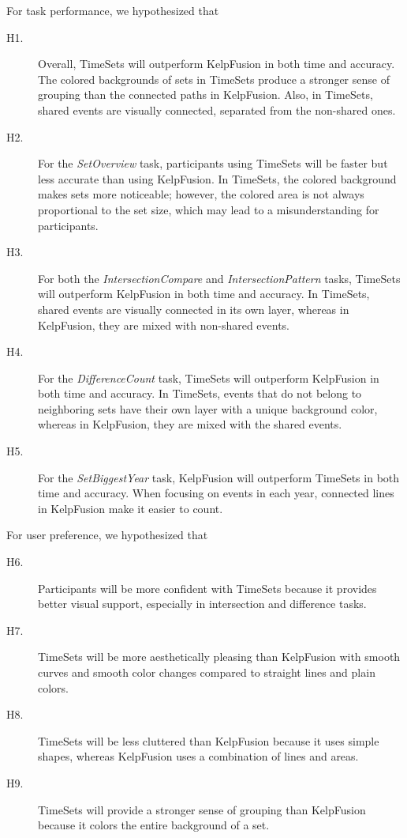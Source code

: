 For task performance, we hypothesized that
\begin{description}
	\item [H1.] Overall, TimeSets will outperform KelpFusion in both time and accuracy. The colored backgrounds of sets in TimeSets produce a stronger sense of grouping than the connected paths in KelpFusion. Also, in TimeSets, shared events are visually connected, separated from the non-shared ones.
	
	\item [H2.] For the \emph{SetOverview} task, participants using TimeSets will be faster but less accurate than using KelpFusion. In TimeSets, the colored background makes sets more noticeable; however, the colored area is not always proportional to the set size, which may lead to a misunderstanding for participants. 
	
	\item [H3.] For both the \emph{IntersectionCompare} and \emph{IntersectionPattern} tasks, TimeSets will outperform KelpFusion in both time and accuracy. In TimeSets, shared events are visually connected in its own layer, whereas in KelpFusion, they are mixed with non-shared events.
	
	\item [H4.] For the \emph{DifferenceCount} task, TimeSets will outperform KelpFusion in both time and accuracy. In TimeSets, events that do not belong to neighboring sets have their own layer with a unique background color, whereas in KelpFusion, they are mixed with the shared events.
	
	\item [H5.] For the \emph{SetBiggestYear} task, KelpFusion will outperform TimeSets in both time and accuracy. When focusing on events in each year, connected lines in KelpFusion make it easier to count.
\end{description}

For user preference, we hypothesized that
\begin{description}
	\item [H6.] Participants will be more confident with TimeSets because it provides better visual support, especially in intersection and difference tasks.
	
	\item [H7.] TimeSets will be more aesthetically pleasing than KelpFusion with smooth curves and smooth color changes compared to straight lines and plain colors.
	
	\item [H8.] TimeSets will be less cluttered than KelpFusion because it uses simple shapes, whereas KelpFusion uses a combination of lines and areas.
	
	\item [H9.] TimeSets will provide a stronger sense of grouping than KelpFusion because it colors the entire background of a set.
\end{description}

